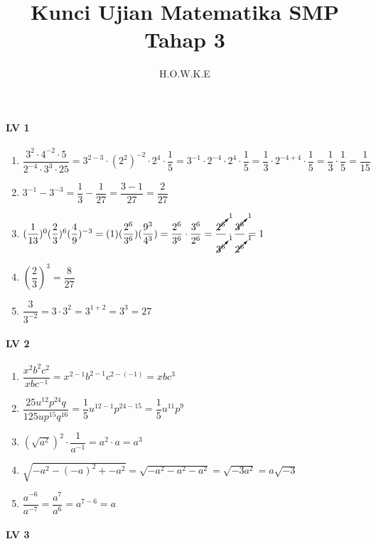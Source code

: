 \documentclass[12pt,a4paper]{article}
\author{H.O.W.K.E}
\title{Kunci Ujian Matematika SMP Tahap 3 }
\begin{document}
	\maketitle
	\paragraph{LV 1}
	\begin{enumerate}
	\item $\dfrac{3^2\cdot 4^{-2} \cdot 5}{2^{-4}\cdot 3^3\cdot 25}=3^{2-3}\cdot(2^2)^{-2}\cdot2^4\cdot \dfrac{1}{5}=3^{-1}\cdot 2^{-4}\cdot 2^4 \cdot \dfrac{1}{5}
	=\dfrac{1}{3}\cdot 2^{-4+4}\cdot \dfrac{1}{5}=\dfrac{1}{3}\cdot\dfrac{1}{5}=\dfrac{1}{15}
	$
	\item $3^{-1}-3^{-3}=\dfrac{1}{3}-\dfrac{1}{27}=\dfrac{3-1}{27}=\dfrac{2}{27}$
	\item $(\dfrac{1}{13})^0(\dfrac{2}{3})^6(\dfrac{4}{9})^{-3}=(1)(\dfrac{2^6}{3^6})(\dfrac{9^3}{4^3})=\dfrac{2^6}{3^6}\cdot\dfrac{3^6}{2^6}=\dfrac{\cancelto{1}{2^6}}{\cancelto{1}{3^6}}\cdot\dfrac{\cancelto{1}{3^6}}{\cancelto{1}{2^6}}=1$
	\item $(\dfrac{2}{3})^{3}=\dfrac{8}{27}$
	\item $\dfrac{3}{3^{-2}}=3\cdot3^{2}=3^{1+2}=3^3=27$
	\end{enumerate}
	\paragraph{LV 2}
	\begin{enumerate}
		\item $\dfrac{x^2b^2c^2}{xbc^{-1}}=x^{2-1}b^{2-1}c^{2-(-1)}=xbc^3$
		\item $\dfrac{25u^{12}p^{24}q}{125up^{15}q^{16}}=\dfrac{1}{5}u^{12-1}p^{24-15}=\dfrac{1}{5}u^{11}p^9$
		\item $(\sqrt{{a^2}})^2\cdot\dfrac{1}{a^{-1}}=a^2\cdot a=a^3$
		\item $\sqrt{-a^{2}-(-a)^{2}+{-a^2}}=\sqrt{-a^2-a^2-a^2}=\sqrt{-3a^2}=a\sqrt{-3}$
		\item $\dfrac{a^{-6}}{a^{-7}}=\dfrac{a^7}{a^6}=a^{7-6}=a$
	\end{enumerate}
	\paragraph{LV 3}
	\begin{enumerate}
			\item $\Big(\dfrac{a^{4}b^{12}c^{4}}{a^{-10}b^{-5}c^{-4}}\Big)^{-\frac{1}{2}} = (a^{4-(-10)}b^{12-(-5)}c^{4-(-4)})^{-\frac{1}{2}}=(a^{14}b^{17}c^{8})^{-\frac{1}{2}}=a^{-7}b^{-\frac{17}{2}}c^{-4}=\dfrac{1}{a^7\sqrt{b^{17}}c^{4}}$
			\item $\Big(\dfrac{x^{-14}\sqrt[12]{x^{4}}x^{8}}{x^{-8}x^{-1/5}x^{-1/4}}\Big)^{-\frac{1}{2}} 
			=(x^{(-14+\frac{4}{12}+8)-(-8+(-\frac{1}{5})+(-\frac{1}{4}))})^{\frac{1}{2}x^{\frac{167}{60}\cdot\frac{1}{2}}=x^{\frac{167}{120}}$
			\item $ \Big(\sqrt{a}\cdot\sqrt{a^4}\Big)^{-2}=a^{(\frac{1}{2}+2)\cdot\frac{1}{2}}=a^{2\frac{1}{2}}$
			\item $((a^2)^{16})^{17}=a^{544}$
			\item $p^{1/2}p^{0}p^{1/4}=p^{\frac{1}{2}+0+\frac{1}{4}}=p^{\frac{3}{4}}$
	\end{enumerate}
\end{document}

